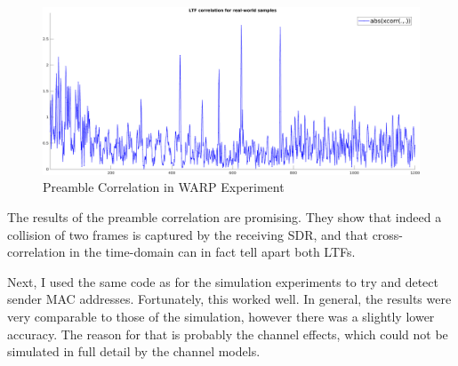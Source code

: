 \begin{figure}[H]
	\centering
  \includegraphics[width=\textwidth]{gfx/plots/capture_collision-20170622-1533-ltf_correlation}
	\caption{Preamble Correlation in WARP Experiment}
	\label{fig:warp_preamble_corr}
\end{figure}

The results of the preamble correlation are promising. They show that indeed a collision of two frames is captured by the receiving \gls{SDR}, and that cross-correlation in the time-domain can in fact tell apart both \glspl{LTF}.

Next, I used the same code as for the simulation experiments to try and detect sender \gls{MAC} addresses. Fortunately, this worked well. In general, the results were very comparable to those of the simulation, however there was a slightly lower accuracy. The reason for that is probably the channel effects, which could not be simulated in full detail by the channel models.
